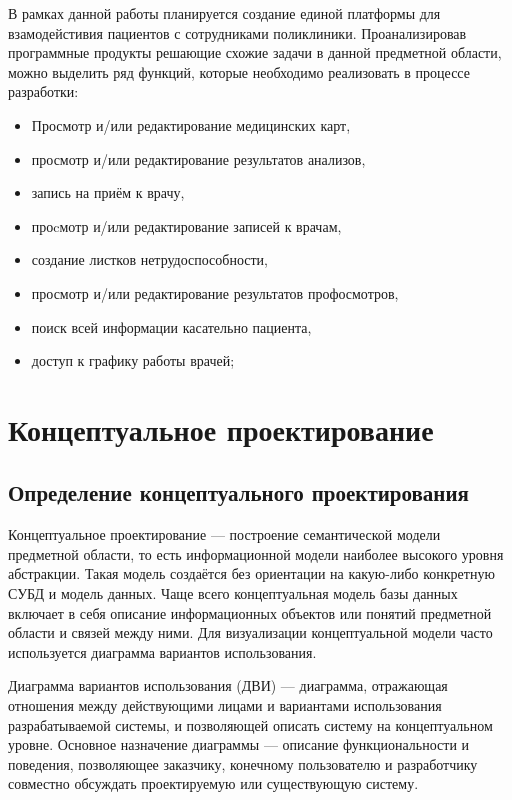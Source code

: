 \documentclass[14pt,a4paper,russian]{extreport}
\begin{document}
В рамках данной работы планируется создание единой платформы для
взамодейстивия пациентов с сотрудниками поликлиники. Проанализировав программные продукты решающие
схожие задачи в данной предметной области, можно выделить ряд функций, которые необходимо
реализовать в процессе разработки:
\begin{itemize}[noitemsep]
		
\renewcommand\labelitemi{--}
            \item Просмотр и/или редактирование медицинских карт,
            \item просмотр и/или редактирование результатов анализов,
            \item запись на приём к врачу,
            \item проcмотр и/или редактирование записей к врачам,
            \item создание листков нетрудоспособности,
            \item просмотр и/или редактирование результатов профосмотров,
            \item поиск всей информации касательно пациента,
            \item доступ к графику работы врачей;
\end{itemize}


\chapter{Концептуальное проектирование}
\section{Определение концептуального проектирования}
Концептуальное проектирование — построение семантической модели предметной
области, то есть информационной модели наиболее высокого уровня абстракции. Такая модель создаётся
без ориентации на какую-либо конкретную СУБД и модель данных.
Чаще всего концептуальная модель базы данных включает в себя описание информационных объектов 
или понятий предметной области и связей между ними. Для визуализации концептуальной
модели часто используется диаграмма вариантов использования.\par
Диаграмма вариантов использования (ДВИ) — диаграмма, отражающая
отношения между действующими лицами и вариантами использования разрабатываемой системы, и
позволяющей описать систему на концептуальном уровне.
Основное назначение диаграммы — описание функциональности и поведения, позволяющее заказчику,
конечному пользователю и разработчику совместно обсуждать проектируемую или существующую
систему.\par
\end{document}
